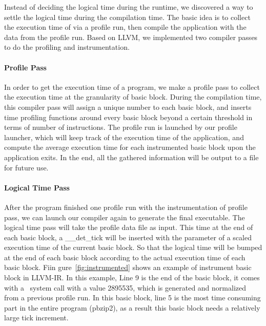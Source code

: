 Instead of deciding the logical time during the runtime, we discovered a way to settle the logical time during the compilation time. The basic idea is to collect the execution time of via a profile run, then compile the application with the data from the profile run. Based on LLVM, we implemented two compiler passes to do the profiling and instrumentation.

\paragraph{Profile Pass}
In order to get the execution time of a program, we make a profile pass to collect the execution time at the granularity of basic block. During the compilation time, this compiler pass will assign a unique number to each basic block, and inserts time profiling functions around every basic block beyond a certain threshold in terms of number of instructions. The profile run is launched by our profile launcher, which will keep track of the execution time of the application, and compute the average execution time for each instrumented basic block upon the application exits. In the end, all the gathered information will be output to a file for future use.

\paragraph{Logical Time Pass}
After the program finished one profile run with the instrumentation of profile pass, we can launch our compiler again to generate the final executable. The logical time pass will take the profile data file as input. This time at the end of each basic block, a \_\_det\_tick will be inserted with the parameter of a scaled execution time of the current basic block. So that the logical time will be bumped at the end of each basic block according to the actual execution time of each basic block. Fiin gure~\ref{fig:instrumented} shows an example of instrument basic block in LLVM-IR. In this example, Line 9 is the end of the basic block, it comes with a \dettick\ system call with a value 2895535, which is generated and normalized from a previous profile run. In this basic block, line 5 is the most time consuming part in the entire program (pbzip2), as a result this basic block needs a relatively large tick increment.

